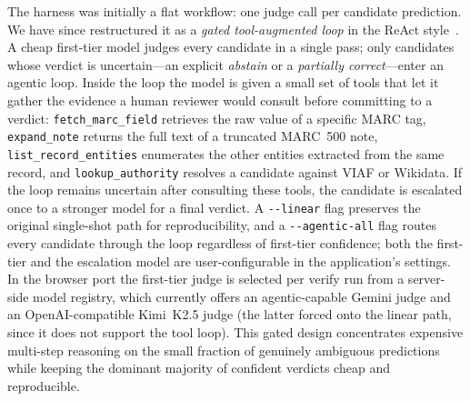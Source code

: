 \documentclass[Afour,sageh,times]{sagej}
\begin{document}
The harness was initially a flat workflow: one judge call per candidate prediction. We have since restructured it as a \emph{gated tool-augmented loop} in the ReAct style~\cite{yao2023react}. A cheap first-tier model judges every candidate in a single pass; only candidates whose verdict is uncertain---an explicit \emph{abstain} or a \emph{partially correct}---enter an agentic loop. Inside the loop the model is given a small set of tools that let it gather the evidence a human reviewer would consult before committing to a verdict: \texttt{fetch\_marc\_field} retrieves the raw value of a specific MARC tag, \texttt{expand\_note} returns the full text of a truncated MARC~500 note, \texttt{list\_record\_entities} enumerates the other entities extracted from the same record, and \texttt{lookup\_authority} resolves a candidate against VIAF or Wikidata. If the loop remains uncertain after consulting these tools, the candidate is escalated once to a stronger model for a final verdict. A \texttt{-{}-linear} flag preserves the original single-shot path for reproducibility, and a \texttt{-{}-agentic-all} flag routes every candidate through the loop regardless of first-tier confidence; both the first-tier and the escalation model are user-configurable in the application's settings. In the browser port the first-tier judge is selected per verify run from a server-side model registry, which currently offers an agentic-capable Gemini judge and an OpenAI-compatible Kimi~K2.5 judge (the latter forced onto the linear path, since it does not support the tool loop). This gated design concentrates expensive multi-step reasoning on the small fraction of genuinely ambiguous predictions while keeping the dominant majority of confident verdicts cheap and reproducible.
\end{document}
